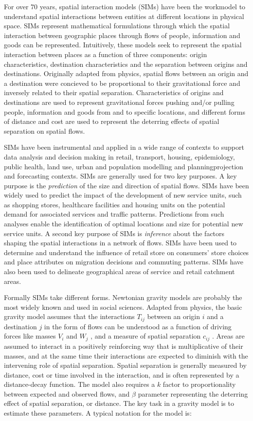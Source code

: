 \documentclass[11pt,letterpaper]{article}
\begin{document}
For over 70 years, spatial interaction models (SIMs) have been the workmodel to understand spatial interactions between entities at different locations in physical space.
SIMs represent mathematical formulations through which the spatial interaction between geographic places through flows of people, information and goods can be represented.
Intuitively, these models seek to represent the spatial interaction between places as a function of three components: origin characteristics, destination characteristics and the separation between origins and destinations.
Originally adapted from physics, spatial flows between an origin and a destination were concieved to be proportional to their gravitational force and inversely related to their spatial separation.
Characteristics of origins and destinations are used to represent gravitational forces pushing and/or pulling people, information and goods from and to specific locations, and different forms of distance and cost are used to represent the deterring effects of spatial separation on spatial flows.

SIMs have been instrumental and applied in a wide range of contexts to support data analysis and decision making in retail, transport, housing, epidemiology, public health, land use, urban and population modelling and planningprojection and forecasting contexts.
SIMs are generally used for two key purposes.
A key purpose is the \emph{prediction} of the size and direction of spatial flows.
SIMs have been widely used to predict the impact of the development of new service units, such as shopping stores, healthcare facilities and housing units on the potential demand for associated services and traffic patterns.
Predictions from such analyses enable the identification of optimal locations and size for potential new service units.
A second key purpose of SIMs is \emph{inference} about the factors shaping the spatial interactions in a network of flows.
SIMs have been used to determine and understand the influence of retail store on consumers' store choices and place attributes on migration decisions and commuting patterns.
SIMs have also been used to delineate geographical areas of service and retail catchment areas.

Formally SIMs take different forms.
Newtonian gravity models are probably the most widely known and used in social sciences.
Adapted from physics, the basic gravity model assumes that the interactions \(T_{i j}\) between an origin \(i\) and a destination \(j\) in the form of flows can be understood as a function of driving forces like masses \(V_{i}\) and \(W_{j}\) , and a measure of spatial separation \(c_{ij}\) .
Areas are assumed to interact in a positively reinforcing way that is multiplicative of their masses, and at the same time their interactions are expected to diminish with the intervening role of spatial separation.
Spatial separation is generally measured by distance, cost or time involved in the interaction, and is often represented by a distance-decay function.
The model also requires a \(k\) factor to proportionality between expected and observed flows, and \(\beta\) parameter representing the deterring effect of spatial separation, or distance.
The key task in a gravity model is to estimate these parameters.
A typical notation for the model is:
\end{document}
